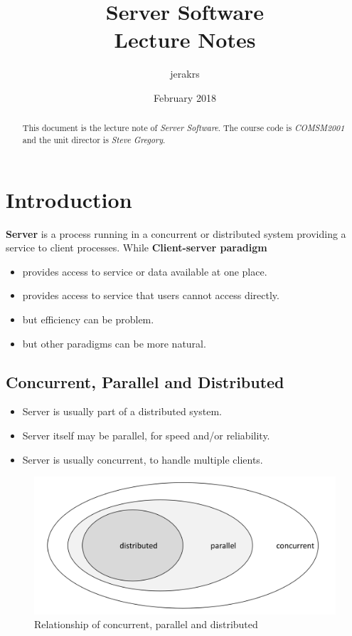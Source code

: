 \documentclass{article}
\title{%
    Server Software \\
    \vspace{0.4cm}
    \large Lecture Notes
}
\author{jerakrs}
\date{February 2018}
\begin{document}
\maketitle

\begin{abstract}
    This document is the lecture note of \textit{Server Software}. The course code is \textit{COMSM2001} and the unit director is \textit{Steve Gregory}.
\end{abstract}


\section{Introduction}

\textbf{Server} is a process running in a concurrent or distributed system providing a service to client processes. While \textbf{Client-server paradigm}

\begin{itemize}
    \item provides access to service or data available at one place.
    \item provides access to service that users cannot access directly.
    \item but efficiency can be problem.
    \item but other paradigms can be more natural.
\end{itemize}

\subsection{Concurrent, Parallel and Distributed}

\begin{itemize}
    \item Server is usually part of a distributed system.
    \item Server itself may be parallel, for speed and/or reliability.
    \item Server is usually concurrent, to handle multiple clients.
\end{itemize}

\begin{figure}
    \centering
    \includegraphics[scale=0.12]{images/relationship.png}
    \caption{Relationship of concurrent, parallel and distributed}
    \label{fig:my_label}
\end{figure}
\end{document}
